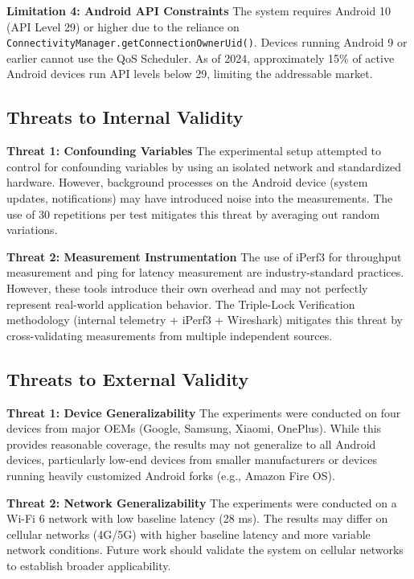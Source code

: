 \textbf{Limitation 4: Android API Constraints}
The system requires Android 10 (API Level 29) or higher due to the reliance on \texttt{ConnectivityManager.getConnectionOwnerUid()}. Devices running Android 9 or earlier cannot use the QoS Scheduler. As of 2024, approximately 15\% of active Android devices run API levels below 29, limiting the addressable market.

\subsection{Threats to Internal Validity}

\textbf{Threat 1: Confounding Variables}
The experimental setup attempted to control for confounding variables by using an isolated network and standardized hardware. However, background processes on the Android device (system updates, notifications) may have introduced noise into the measurements. The use of 30 repetitions per test mitigates this threat by averaging out random variations.

\textbf{Threat 2: Measurement Instrumentation}
The use of iPerf3 for throughput measurement and ping for latency measurement are industry-standard practices. However, these tools introduce their own overhead and may not perfectly represent real-world application behavior. The Triple-Lock Verification methodology (internal telemetry + iPerf3 + Wireshark) mitigates this threat by cross-validating measurements from multiple independent sources.

\subsection{Threats to External Validity}

\textbf{Threat 1: Device Generalizability}
The experiments were conducted on four devices from major OEMs (Google, Samsung, Xiaomi, OnePlus). While this provides reasonable coverage, the results may not generalize to all Android devices, particularly low-end devices from smaller manufacturers or devices running heavily customized Android forks (e.g., Amazon Fire OS).

\textbf{Threat 2: Network Generalizability}
The experiments were conducted on a Wi-Fi 6 network with low baseline latency (28 ms). The results may differ on cellular networks (4G/5G) with higher baseline latency and more variable network conditions. Future work should validate the system on cellular networks to establish broader applicability.

